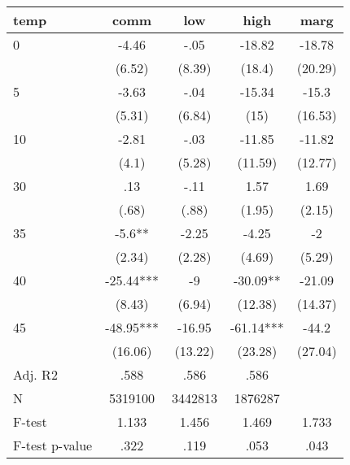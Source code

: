 \documentclass[]{article}
\begin{document}
\begin{tabular}{lcccc} \hline
temp & comm & low & high & marg \\ \hline
0 & -4.46 & -.05 & -18.82 & -18.78 \\
 & (6.52) & (8.39) & (18.4) & (20.29) \\
5 & -3.63 & -.04 & -15.34 & -15.3 \\
 & (5.31) & (6.84) & (15) & (16.53) \\
10 & -2.81 & -.03 & -11.85 & -11.82 \\
 & (4.1) & (5.28) & (11.59) & (12.77) \\
30 & .13 & -.11 & 1.57 & 1.69 \\
 & (.68) & (.88) & (1.95) & (2.15) \\
35 & -5.6** & -2.25 & -4.25 & -2 \\
 & (2.34) & (2.28) & (4.69) & (5.29) \\
40 & -25.44*** & -9 & -30.09** & -21.09 \\
 & (8.43) & (6.94) & (12.38) & (14.37) \\
45 & -48.95*** & -16.95 & -61.14*** & -44.2 \\
 & (16.06) & (13.22) & (23.28) & (27.04) \\
\hline Adj. R2 & .588 & .586 & .586 &  \\
N & 5319100 & 3442813 & 1876287 &  \\
F-test & 1.133 & 1.456 & 1.469 & 1.733 \\
 F-test p-value & .322 & .119 & .053 & .043 \\ \hline
\end{tabular}
\end{document}
